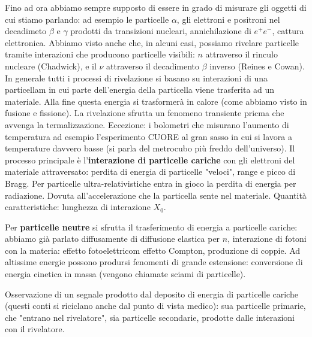 Fino ad ora abbiamo sempre supposto di essere in grado di misurare gli oggetti di cui stiamo parlando: ad esempio le particelle $\alpha$, gli elettroni e positroni nel decadimeto $\beta$ e $\gamma$ prodotti da transizioni nucleari, annichilazione di $e^+e^-$, cattura elettronica. Abbiamo visto anche che, in alcuni casi, possiamo rivelare particelle tramite interazioni che producono particelle visibili: $n$ attraverso il rinculo nucleare (Chadwick), e il $\nu$ attraverso il decadimento $\beta$ inverso (Reines e Cowan). In generale tutti i processi di rivelazione si basano su interazioni di una particellam in cui parte dell'energia della particella viene trasferita ad un materiale. Alla fine questa energia si trasformerà in calore (come abbiamo visto in fusione e fissione). La rivelazione sfrutta un fenomeno transiente pricma che avvenga la termalizzazione. Eccezione: i bolometri che misurano l'aumento di temperatura ad esempio l'esperimento CUORE al gran sasso in cui si lavora a temperature davvero basse (si parla del metrocubo più freddo dell'universo). Il processo principale è l'\textbf{interazione di particelle cariche} con gli elettroni del materiale attraversato: perdita di energia di particelle "veloci", range e picco di Bragg. Per particelle ultra-relativistiche entra in gioco la perdita di energia per radiazione. Dovuta all'accelerazione che la particella sente nel materiale. Quantità caratteristiche: lunghezza di interazione $X_0$.

Per \textbf{particelle neutre} si sfrutta il trasferimento di energia a particelle cariche: abbiamo già parlato diffusamente di diffusione elastica per $n$, interazione di fotoni con la materia: effetto fotoelettricom effetto Compton, produzione di coppie. Ad altissime energie possono prodursi fenomenti di grande estensione: conversione di energia cinetica in massa (vengono chiamate sciami di particelle).


Osservazione di un segnale prodotto dal deposito di energia di particelle cariche (questi conti si riciclano anche dal punto di vista medico): sua particelle primarie, che "entrano nel rivelatore", sia particelle secondarie, prodotte dalle interazioni con il rivelatore. 
